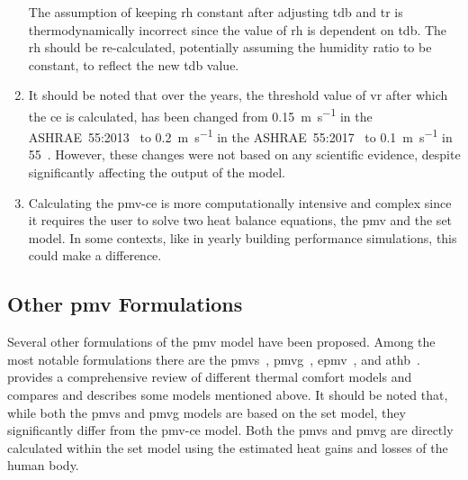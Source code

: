 \begin{enumerate}
    The assumption of keeping \ac{rh} constant after adjusting \ac{tdb} and \ac{tr} is thermodynamically incorrect since the value of \ac{rh} is dependent on \ac{tdb}.
    The \ac{rh} should be re-calculated, potentially assuming the humidity ratio to be constant, to reflect the new \ac{tdb} value.
    \item It should be noted that over the years, the threshold value of \ac{vr} after which the \ac{ce} is calculated, has been changed from \qty{0.15}{\m\per\s} in the ASHRAE~55:2013~\cite{ASHRAE552013} to \qty{0.2}{\m\per\s} in the ASHRAE~55:2017~\cite{ASHRAE552017, arens_moving_2009} to \qty{0.1}{\m\per\s} in \gls{55}~\cite{ashrae552023}.
    However, these changes were not based on any scientific evidence, despite significantly affecting the output of the model.
    \item Calculating the \ac{pmv-ce} is more computationally intensive and complex since it requires the user to solve two heat balance equations, the \ac{pmv} and the \ac{set} model.
    In some contexts, like in yearly building performance simulations, this could make a difference. 
\end{enumerate}

\subsection{Other \ac{pmv} Formulations}\label{subsec:other-pmv-formulations}
Several other formulations of the \ac{pmv} model have been proposed.
Among the most notable formulations there are the \ac{pmvs}~\cite{GaggeSET}, \ac{pmvg}~\cite{GaggeSET},  \ac{epmv}~\cite{Toftum2002}, and \ac{athb}~\cite{Schweiker2022}.
 provides a comprehensive review of different thermal comfort models and compares and describes some models mentioned above.
It should be noted that, while both the \ac{pmvs} and \ac{pmvg} models are based on the \ac{set} model, they significantly differ from the \ac{pmv-ce} model.
Both the \ac{pmvs} and \ac{pmvg} are directly calculated within the \ac{set} model using the estimated heat gains and losses of the human body.

